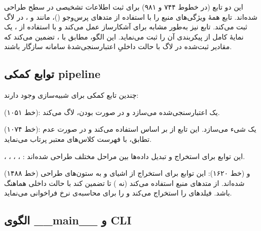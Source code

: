 این دو تابع (در خطوط ۷۴۴ و ۹۸۱) برای ثبت اطلاعات تشخیصی در سطح  طراحی شده‌اند. تابع  همهٔ ویژگی‌های منبع را با استفاده از متدهای پرس‌وجو ()، مانند  و ، در لاگ ثبت می‌کند. تابع  نیز به‌طور مشابه برای آشکارساز عمل می‌کند و با استفاده از ، یک نمایهٔ کامل از پیکربندی آن را ثبت می‌نماید. این الگو، مطابق با ، تضمین می‌کند که مقادیر ثبت‌شده در لاگ با حالت داخلیِ اعتبارسنجی‌شدهٔ سامانه سازگار باشند.


\subsection{توابع کمکی pipeline}

چندین تابع کمکی برای  شبیه‌سازی وجود دارند:

 (خط ۱۰۵۱): یک  اعتبارسنجی‌شده می‌سازد و در صورت  بودن، لاگ می‌کند.

 (خط ۱۰۷۴): یک شیء  می‌سازد. این تابع از  بر اساس  استفاده می‌کند و در صورت عدم تطابق،  با فهرست کلاس‌های معتبر پرتاب می‌نماید.

، ، ، ، : این توابع برای استخراج و تبدیل داده‌ها بین مراحل مختلف  طراحی شده‌اند.

 (خط ۱۴۸۸) و  (خط ۱۶۲۰): این توابع برای استخراج  از اشیای  و  به ستون‌های  طراحی شده‌اند.  از متدهای  منبع استفاده می‌کند (نه ) تا تضمین کند  با حالت داخلی هماهنگ باشد.  فیلدهای  را استخراج می‌کند و  را برای محاسبه‌ی نرخ  فراخوانی می‌نماید.

\subsection{الگوی \_\_main\_\_ و CLI}

